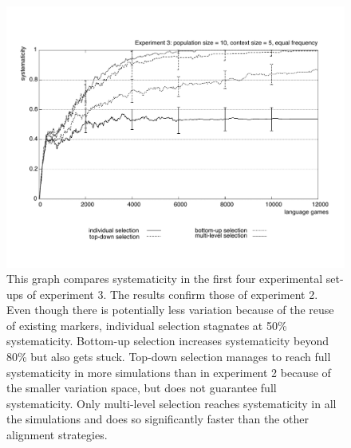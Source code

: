 \begin{figure}[p]
\centerline{\includegraphics[width=\textwidth]{Chapter4/figs/systematicity3}}
  \caption[Experiment 3: systematicity]{This graph compares systematicity in the first four experimental set-ups of experiment 3. The results confirm those of experiment 2. Even though there is potentially less variation because of the reuse of existing markers, individual selection stagnates at 50\% systematicity. Bottom-up selection increases systematicity beyond 80\% but also gets stuck. Top-down selection manages to reach full systematicity in more simulations than in experiment 2 because of the smaller variation space, but does not guarantee full systematicity. Only multi-level selection reaches systematicity in all the simulations and does so significantly faster than the other alignment strategies.}
   \label{f:systematicity3}
\end{figure}


